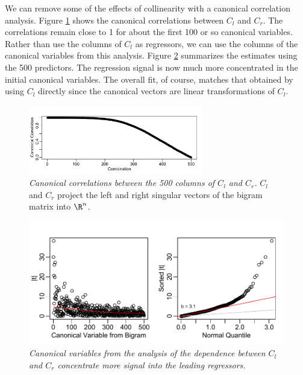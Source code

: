 \documentclass[12pt]{article}
\begin{document}
We can remove some of the effects of collinearity with a canonical correlation analysis.  Figure \ref{fig:cca} shows the canonical correlations between  $C_l$ and $C_r$.  The correlations remain close to 1 for about the first 100 or so canonical variables.  Rather than use the columns of $C_l$ as regressors, we can use the columns of the canonical variables from this analysis.  Figure \ref{fig:regrBcca} summarizes the estimates using the 500 predictors.  The regression signal is now much more concentrated in the initial canonical variables.  The overall fit, of course, matches that obtained by using $C_l$ directly since the canonical vectors are linear transformations of $C_l$.
 
 
 \begin{figure}
 \caption{ \label{fig:cca} { \sl Canonical correlations between the 500 columns of $C_l$ and $C_r$.} $C_l$ and $C_r$ project the left and right singular vectors of the bigram matrix into $\R^n$.}

 \centerline{
 \vspace{0.1in}
 \includegraphics[width=3in]{figures/cca}  }
 \vspace{0.2in}
 \end{figure}


 \begin{figure}
 \caption{ \label{fig:regrBcca} { \sl Canonical variables from the analysis of the dependence between $C_l$ and $C_r$ concentrate more signal into the leading regressors.}}

 \centerline{
 \vspace{0.1in}
 \includegraphics[width=5in]{figures/regrBcca}  }
 \vspace{0.2in}
 \end{figure}
\end{document}
